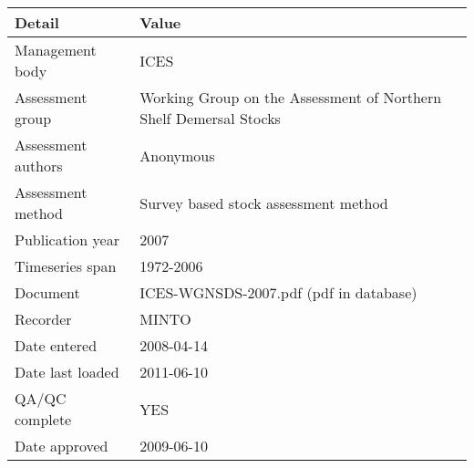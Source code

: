 \begin{table}[htb]
\centering
\begin{tabular}{lp{7cm}}
\toprule
Detail & Value \\
\midrule
Management body    & ICES                                                              \\
Assessment group   & Working Group on the Assessment of Northern Shelf Demersal Stocks \\
Assessment authors & Anonymous                                                         \\
Assessment method  & Survey based stock assessment method                              \\
Publication year   & 2007                                                              \\
Timeseries span    & 1972-2006                                                         \\
Document           & ICES-WGNSDS-2007.pdf (pdf in database)                            \\
Recorder           & MINTO                                                             \\
Date entered       & 2008-04-14                                                        \\
Date last loaded   & 2011-06-10                                                        \\
QA/QC complete     & YES                                                               \\
Date approved      & 2009-06-10                                                        \\
\bottomrule
\end{tabular}
\label{tab:assessdet}
\end{table}
